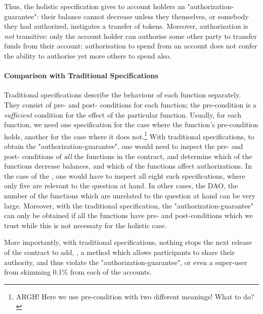  Thus, the holistic specification gives to account holders an
 "authorization-guarantee": their balance cannot decrease unless they
 themselves, or somebody they had authorized, instigates a transfer of
 tokens. Moreover, authorization is {\em not} transitive: only the
 account holder can authorise some other party to transfer funds from
 their account: authorisation to spend from an account does not confer
 the ability to authorise yet more others to spend also.
 
\paragraph{Comparison with Traditional Specifications}
 
 Traditional  specifications %
 describe the behaviour of each function separately.
 They  consist of pre- and post- conditions for each function; the pre-condition is 
 a {\em sufficient} condition for the effect of the particular function.
 Usually, for each function, we need one specification for the case 
 where the function's pre-condition holds, another for the case where it does not.\footnote{ARGH! 
 Here we use pre-condition with two different meanings! What to do?}
With traditional  specifications, to obtain the "authorization-guarantee", 
one would need to inspect the pre- and post- conditions of {\em all} the functions
in the contract, and determine which of the functions decrease balances, and which of the functions 
 affect authorizations.
 In the case of the , one would have to inspect all eight such specifications, 
 where only five are relevant to the question at hand.
 In other cases, \eg the DAO, the number of the functions which are unrelated
 to the question at hand can be very large.
 Moreover, with the traditional specification, the "authorization-guarantee" can only be 
 obtained if  all the functions have pre- and post-conditions which we
 trust while this is not necessaty for the
 holistic case.
 
More importantly, with traditional  specifications, nothing stops the next release of the contract to add, 
\eg, a method which allows participants to share their authority, and thus
violate the "authorization-guarantee", or even a super-user from skimming 0.1\% from each of the accounts.

